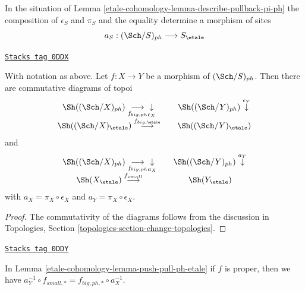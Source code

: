 In the situation of Lemma \ref{etale-cohomology-lemma-describe-pullback-pi-ph}
the composition of $\epsilon_S$ and $\pi_S$ and the equality
determine a morphism of sites
$$
a_S : (\Sch/S)_{ph} \longrightarrow S_\etale
$$

\begin{lemma}
\label{etale-cohomology-lemma-push-pull-ph-etale}
\href{https://stacks.math.columbia.edu/tag/0DDX}{\texttt{Stacks tag 0DDX}}

With notation as above.
Let $f : X \to Y$ be a morphism of $(\Sch/S)_{ph}$.
Then there are commutative diagrams of topoi
$$
\begin{array}{ccc}\Sh((\Sch/X)_{ph}) \underset{f_{big, ph}}{\longrightarrow}\underset{\epsilon_X}{\downarrow} &  & \Sh((\Sch/Y)_{ph}) \overset{\epsilon_Y}{\downarrow} \\ \Sh((\Sch/X)_\etale) \overset{f_{big, \etale}}{\longrightarrow} &  & \Sh((\Sch/Y)_\etale)\end{array}
$$
and
$$
\begin{array}{ccc}\Sh((\Sch/X)_{ph}) \underset{f_{big, ph}}{\longrightarrow}\underset{a_X}{\downarrow} &  & \Sh((\Sch/Y)_{ph}) \overset{a_Y}{\downarrow} \\ \Sh(X_\etale) \overset{f_{small}}{\longrightarrow} &  & \Sh(Y_\etale)\end{array}
$$
with $a_X = \pi_X \circ \epsilon_X$ and $a_Y = \pi_X \circ \epsilon_X$.
\end{lemma}

\begin{proof}
The commutativity of the diagrams follows from the discussion in
Topologies, Section \ref{topologies-section-change-topologies}.
\end{proof}

\begin{lemma}
\label{etale-cohomology-lemma-proper-push-pull-ph-etale}
\href{https://stacks.math.columbia.edu/tag/0DDY}{\texttt{Stacks tag 0DDY}}

In Lemma \ref{etale-cohomology-lemma-push-pull-ph-etale} if $f$ is proper, then we have
$a_Y^{-1} \circ f_{small, *} = f_{big, ph, *} \circ a_X^{-1}$.
\end{lemma}

